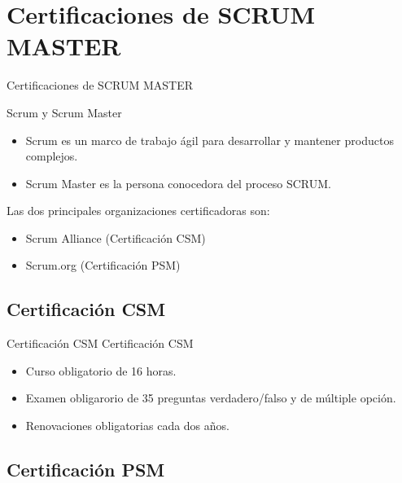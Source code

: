 
\section{Certificaciones de SCRUM MASTER}
\begin{frame}[allowframebreaks]{Certificaciones de SCRUM MASTER}
	
	Scrum y Scrum Master
	
	\begin{itemize}
		\item Scrum es un marco de trabajo ágil para desarrollar y mantener productos complejos.
		\item Scrum Master es la persona conocedora del proceso SCRUM.
	\end{itemize}


	Las dos principales organizaciones certificadoras son:
	\begin{itemize}
		\item Scrum Alliance (Certificación CSM)
		\item Scrum.org (Certificación PSM)
	\end{itemize}

\end{frame}

\subsection{Certificación CSM}

\begin{frame}{Certificación CSM}
	Certificación CSM 
	\begin{itemize}
		\item Curso obligatorio de 16 horas.
		\item Examen obligarorio de 35 preguntas verdadero/falso y de múltiple opción.
		\item Renovaciones obligatorias cada dos años.
	\end{itemize}

\end{frame}

\subsection{Certificación PSM}

